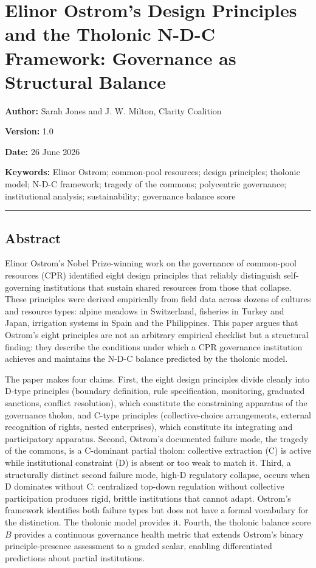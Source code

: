 \documentclass[
  11pt,
  letterpaper,
]{article}
\author{}
\date{}
\begin{document}
\section{Elinor Ostrom's Design Principles and the Tholonic N-D-C
Framework: Governance as Structural
Balance}\label{elinor-ostroms-design-principles-and-the-tholonic-n-d-c-framework-governance-as-structural-balance}

\textbf{Author:} Sarah Jones and J. W. Milton, Clarity Coalition

\textbf{Version:} 1.0

\textbf{Date:} 26 June 2026

\textbf{Keywords:} Elinor Ostrom; common-pool resources; design
principles; tholonic model; N-D-C framework; tragedy of the commons;
polycentric governance; institutional analysis; sustainability;
governance balance score

\begin{center}\rule{0.5\linewidth}{0.5pt}\end{center}

\subsection{Abstract}\label{abstract}

Elinor Ostrom's Nobel Prize-winning work on the governance of
common-pool resources (CPR) identified eight design principles that
reliably distinguish self-governing institutions that sustain shared
resources from those that collapse. These principles were derived
empirically from field data across dozens of cultures and resource
types: alpine meadows in Switzerland, fisheries in Turkey and Japan,
irrigation systems in Spain and the Philippines. This paper argues that
Ostrom's eight principles are not an arbitrary empirical checklist but a
structural finding: they describe the conditions under which a CPR
governance institution achieves and maintains the N-D-C balance
predicted by the tholonic model.

The paper makes four claims. First, the eight design principles divide
cleanly into D-type principles (boundary definition, rule specification,
monitoring, graduated sanctions, conflict resolution), which constitute
the constraining apparatus of the governance tholon, and C-type
principles (collective-choice arrangements, external recognition of
rights, nested enterprises), which constitute its integrating and
participatory apparatus. Second, Ostrom's documented failure mode, the
tragedy of the commons, is a C-dominant partial tholon: collective
extraction (C) is active while institutional constraint (D) is absent or
too weak to match it. Third, a structurally distinct second failure
mode, high-D regulatory collapse, occurs when D dominates without C:
centralized top-down regulation without collective participation
produces rigid, brittle institutions that cannot adapt. Ostrom's
framework identifies both failure types but does not have a formal
vocabulary for the distinction. The tholonic model provides it. Fourth,
the tholonic balance score \(B\) provides a continuous governance health
metric that extends Ostrom's binary principle-presence assessment to a
graded scalar, enabling differentiated predictions about partial
institutions.
\end{document}

